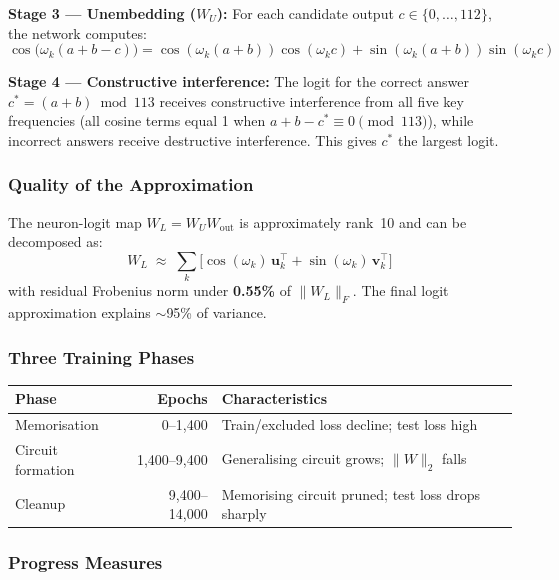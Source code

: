 \documentclass[11pt, a4paper]{article}
\theoremstyle{definition}
\theoremstyle{plain}
\begin{document}
\textbf{Stage 3 --- Unembedding ($W_U$):} For each candidate output $c \in \{0, \ldots, 112\}$, the network computes:
\begin{equation}
  \cos\bigl(\omega_k(a + b - c)\bigr) = \cos(\omega_k(a{+}b))\cos(\omega_k c) + \sin(\omega_k(a{+}b))\sin(\omega_k c)
\end{equation}

\textbf{Stage 4 --- Constructive interference:} The logit for the correct answer $c^* = (a + b) \bmod 113$ receives constructive interference from all five key frequencies (all cosine terms equal 1 when $a + b - c^* \equiv 0 \pmod{113}$), while incorrect answers receive destructive interference. This gives $c^*$ the largest logit.

\subsubsection{Quality of the Approximation}

The neuron-logit map $W_L = W_U W_{\text{out}}$ is approximately rank~10 and can be decomposed as:
\[
  W_L \;\approx\; \sum_k \bigl[\cos(\omega_k)\, \mathbf{u}_k^\top + \sin(\omega_k)\, \mathbf{v}_k^\top\bigr]
\]
with residual Frobenius norm under \textbf{0.55\%} of $\|W_L\|_F$. The final logit approximation explains ${\sim}$95\% of variance.

\subsubsection{Three Training Phases}

\begin{center}
\begin{tabular}{lrl}
  \toprule
  \textbf{Phase} & \textbf{Epochs} & \textbf{Characteristics} \\
  \midrule
  Memorisation & 0--1{,}400 & Train/excluded loss decline; test loss high \\
  Circuit formation & 1{,}400--9{,}400 & Generalising circuit grows; $\|W\|_2$ falls \\
  Cleanup & 9{,}400--14{,}000 & Memorising circuit pruned; test loss drops sharply \\
  \bottomrule
\end{tabular}
\end{center}

\subsubsection{Progress Measures}
\end{document}
